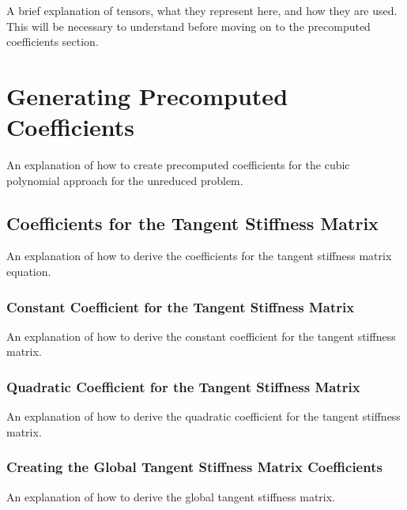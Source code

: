 \documentclass[twocolumn,10pt]{asme2ej}
\begin{document}
A brief explanation of tensors, what they represent here, and how they are used. This will be necessary to understand
before moving on to the precomputed coefficients section.

\section{Generating Precomputed Coefficients}

An explanation of how to create precomputed coefficients for the cubic polynomial approach for the unreduced problem.

\subsection{Coefficients for the Tangent Stiffness Matrix}

An explanation of how to derive the coefficients for the tangent stiffness matrix equation.

\subsubsection{Constant Coefficient for the Tangent Stiffness Matrix}

An explanation of how to derive the constant coefficient for the tangent stiffness matrix.

\subsubsection{Quadratic Coefficient for the Tangent Stiffness Matrix}

An explanation of how to derive the quadratic coefficient for the tangent stiffness matrix.

\subsubsection{Creating the Global Tangent Stiffness Matrix Coefficients}

An explanation of how to derive the global tangent stiffness matrix.

\end{document}
